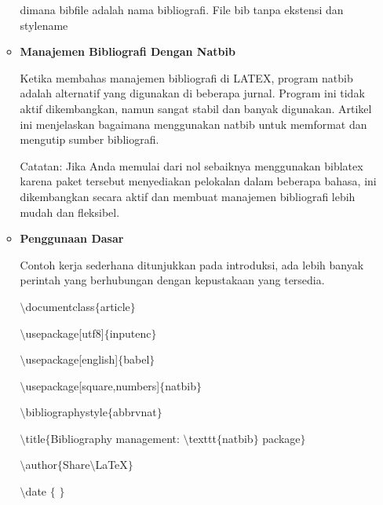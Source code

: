\begin{itemize}
\begin{itemize}
dimana bibfile adalah nama bibliografi. File bib tanpa ekstensi dan stylename\par

\vspace{12pt}
	\item {\fontsize{14pt}{14pt}\selectfont \textbf{Manajemen Bibliografi Dengan Natbib}}\par

Ketika membahas manajemen bibliografi di LATEX, program natbib adalah alternatif yang digunakan di beberapa jurnal. Program ini tidak aktif dikembangkan, namun sangat stabil dan banyak digunakan. Artikel ini menjelaskan bagaimana menggunakan natbib untuk memformat dan mengutip sumber bibliografi.\par

Catatan: Jika Anda memulai dari nol sebaiknya menggunakan biblatex karena paket tersebut menyediakan pelokalan dalam beberapa bahasa, ini dikembangkan secara aktif dan membuat manajemen bibliografi lebih mudah dan fleksibel.\par

	\item {\fontsize{14pt}{14pt}\selectfont \textbf{Penggunaan Dasar}}\par

Contoh kerja sederhana ditunjukkan pada introduksi, ada lebih banyak perintah yang berhubungan dengan kepustakaan yang tersedia.\par

\hspace*{0.5in}$\setminus$documentclass$ \{ $article$ \} $\par

$\setminus$usepackage[utf8]$ \{ $inputenc$ \} $\par

$\setminus$usepackage[english]$ \{ $babel$ \} $\par

$\setminus$usepackage[square,numbers]$ \{ $natbib$ \} $\par

$\setminus$bibliographystyle$ \{ $abbrvnat$ \} $\par

$\setminus$title$ \{ $Bibliography management: $\setminus$texttt$ \{ $natbib$ \} $ package$ \} $\par

$\setminus$author$ \{ $Share$\setminus$LaTeX$ \} $\par

$\setminus$date $ \{ $ $ \} $\par


\end{itemize}
\end{itemize}
